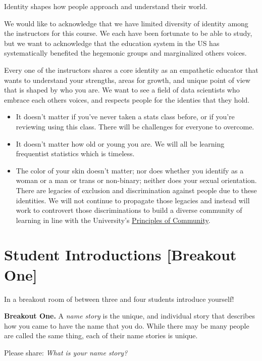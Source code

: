 \documentclass[
]{book}
\providecommand{\tightlist}{%
  \setlength{\itemsep}{0pt}\setlength{\parskip}{0pt}}
\theoremstyle{definition}
\theoremstyle{definition}
\theoremstyle{definition}
\theoremstyle{definition}
\theoremstyle{remark}
\begin{document}
Identity shapes how people approach and understand their world.

We would like to acknowledge that we have limited diversity of identity among the instructors for this course. We each have been fortunate to be able to study, but we want to acknowledge that the education system in the US has systematically benefited the hegemonic groups and marginalized others voices.

Every one of the instructors shares a core identity as an empathetic educator that wants to understand your strengths, areas for growth, and unique point of view that is shaped by who you are. We want to see a field of data scientists who embrace each others voices, and respects people for the identies that they hold.

\begin{itemize}
\tightlist
\item
  It doesn't matter if you've never taken a stats class before, or if you're reviewing using this class. There will be challenges for everyone to overcome.
\item
  It doesn't matter how old or young you are. We will all be learning frequentist statistics which is timeless.
\item
  The color of your skin doesn't matter; nor does whether you identify as a woman or a man or trans or non-binary; neither does your sexual orientation. There are legacies of exclusion and discrimination against people due to these identities. We will not continue to propagate those legacies and instead will work to controvert those discriminations to build a diverse community of learning in line with the University's \href{https://diversity.berkeley.edu/principles-community}{Principles of Community}.
\end{itemize}

\hypertarget{student-introductions-breakout-one}{%
\section{Student Introductions {[}Breakout One{]}}\label{student-introductions-breakout-one}}

In a breakout room of between three and four students introduce yourself!

\begin{breakout}
\textbf{Breakout One.} A \emph{name story} is the unique, and individual story that describes how you came to have the name that you do. While there may be many people are called the same thing, each of their name stories is unique.

Please share: \emph{What is your name story?}

\end{breakout}
\end{document}
